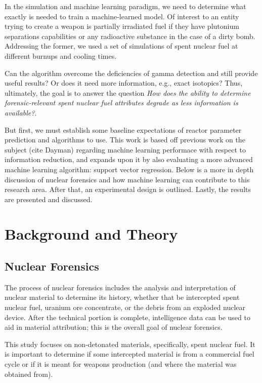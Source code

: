 \documentclass{anstrans}
\begin{document}
 In the simulation and machine
learning paradigm, we need to determine what exactly is needed to train a
machine-learned model. Of interest to an entity trying to create a weapon is
partially irradiated fuel if they have plutonium separations capabilities or
any radioactive substance in the case of a dirty bomb. Addressing the former,
we used a set of simulations of spent nuclear fuel at different burnups and
cooling times. 

Can the algorithm overcome the deficiencies of gamma detection and still
provide useful results? Or does it need more information, e.g., exact
isotopics? Thus, ultimately, the goal is to answer the question \textit{How
does the ability to determine forensic-relevant spent nuclear fuel attributes
degrade as less information is available?}. 

But first, we must establish some baseline expectations of reactor parameter
prediction and algorithms to use.  This work is based off previous work on the
subject (cite Dayman) regarding machine learning performace with respect to
information reduction, and expands upon it by also evaluating a more advanced
machine learning algorithm: support vector regression. Below is a more in depth
discussion of nuclear forensics and how machine learning can contribute to this
research area. After that, an experimental design is outlined. Lastly, the
results are presented and discussed. 

\section{Background and Theory}

\subsection{Nuclear Forensics}

The process of nuclear forensics includes the analysis and interpretation of
nuclear material to determine its history, whether that be intercepted spent
nuclear fuel, uranium ore concentrate, or the debris from an exploded nuclear
device. After the technical portion is complete, intelligence data can be used
to aid in material attribution; this is the overall goal of nuclear forensics. 

This study focuses on non-detonated materials, specifically, spent nuclear
fuel. It is important to determine if some intercepted material is from a
commercial fuel cycle or if it is meant for weapons production (and where the
material was obtained from). 
\end{document}
